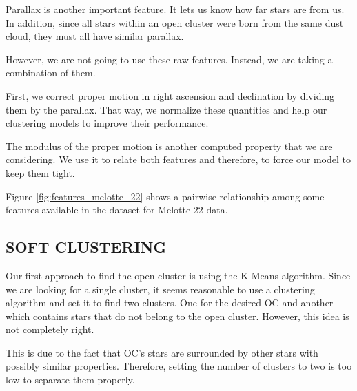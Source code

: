 \documentclass[11pt,a4paper,english,twocolumn]{article}
\begin{document}
Parallax is another important feature. It lets us know how far stars are from us.
In addition, since all stars within an open cluster were born from the same dust cloud,
they must all have similar parallax.

However, we are not going to use these raw features.
Instead, we are taking a combination of them.

First, we correct proper motion in right ascension and declination by dividing them by
the parallax. That way, we normalize these quantities and help our clustering models
to improve their performance.

The modulus of the proper motion is another computed property that we are considering.
We use it to relate both features and therefore, to force our model to keep them tight.

Figure \ref{fig:features_melotte_22} shows a pairwise relationship among some features
available in the dataset for Melotte 22 data.

\subsection{SOFT CLUSTERING}

Our first approach to find the open cluster is using the K-Means algorithm.
Since we are looking for a single cluster, it seems reasonable to use a clustering
algorithm and set it to find two clusters. One for the desired OC and another which
contains stars that do not belong to the open cluster.
However, this idea is not completely right.

This is due to the fact that OC's stars are surrounded by other stars with possibly similar
properties. Therefore, setting the number of clusters to two is too low to separate them properly.
\end{document}
